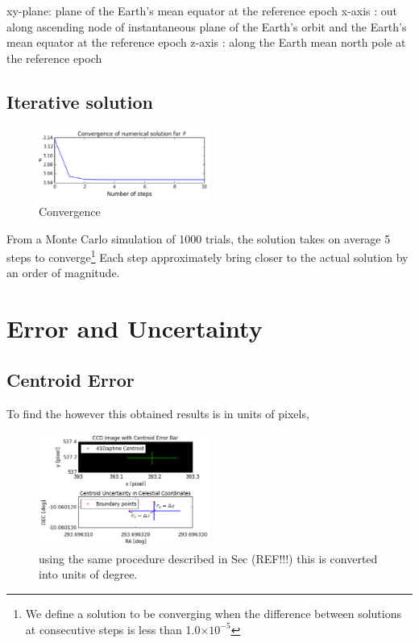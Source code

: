 \documentclass[authoryear, 12pt,5p, times]{elsarticle}
\begin{document}
	 xy-plane: plane of the Earth's mean equator at the reference epoch
    x-axis  : out along ascending node of instantaneous plane of the Earth's
              orbit and the Earth's mean equator at the reference epoch
    z-axis  : along the Earth mean north pole at the reference epoch
    \subsection{Iterative solution}
    	\begin{figure}[h!]
\includegraphics[width=0.5\textwidth]{figures/convergence_example}
\caption{ Convergence}
\label{convergence_example}
\end{figure}
    From a Monte Carlo simulation of 1000 trials, the solution takes on average 5 steps to converge\footnote{ We define a solution to be converging when the difference between solutions at consecutive steps is less than 1.0$\times10^{-5}$} Each step approximately  bring  closer to the actual solution by an order of magnitude. 
\section{Error and Uncertainty}
\subsection{Centroid Error}
To find the 
however this obtained results is in units of pixels, 
    	\begin{figure}[h!]
\includegraphics[width=0.5\textwidth]{figures/uncertainty_range}
\caption{ using the same procedure described in Sec (REF!!!) this is converted into units of degree.}
\label{uncertainty_range}
\end{figure}
\end{document}
